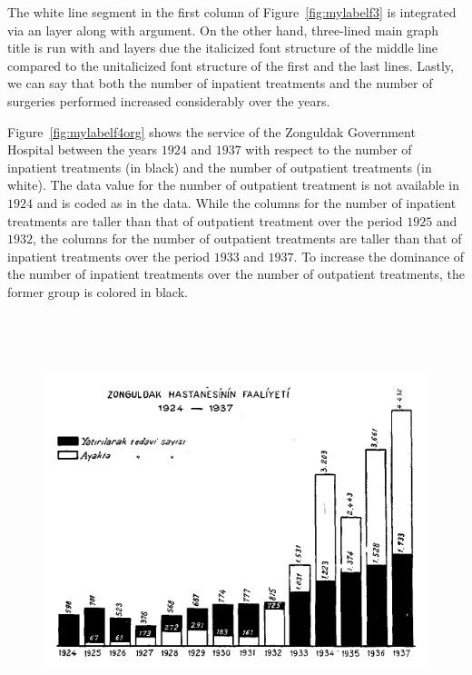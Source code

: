 The white line segment in the first column of Figure~\ref{fig:mylabelf3} is integrated via an  layer along with  argument. On the other hand, three-lined main graph title is run with  and  layers due the italicized font structure of the middle line compared to the unitalicized font structure of the first and the last lines. Lastly, we can say that both the number of inpatient treatments and the number of surgeries performed increased considerably over the years.

Figure~\ref{fig:mylabelf4org} shows the service of the Zonguldak Government Hospital between the years $1924$ and $1937$ with respect to the number of inpatient treatments (in black) and the number of outpatient treatments (in white). The data value for the number of outpatient treatment is not available in $1924$ and is coded as  in the data. While the columns for the number of inpatient treatments are taller than that of outpatient treatment over the period $1925$ and $1932$, the columns for the number of outpatient treatments are taller than that of inpatient treatments over the period $1933$ and $1937$. To increase the dominance of the number of inpatient treatments over the number of outpatient treatments, the former group is colored in black.

\begin{figure}[hbt!]
	\centering
	\includegraphics[width=12cm,height=12cm,keepaspectratio]{Zonguldak_original.png}
\end{figure}

